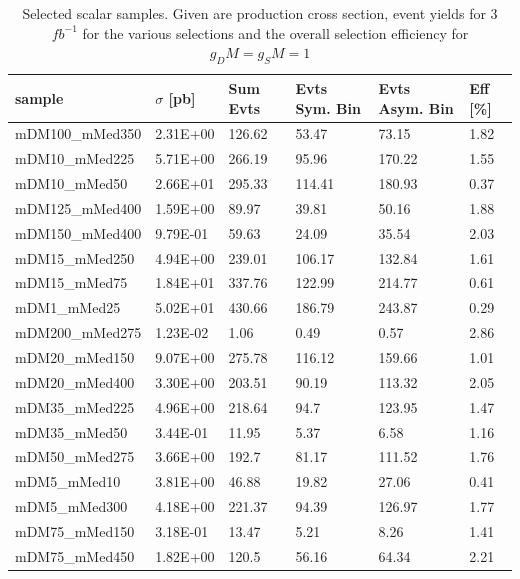 \begin{table}[h]
\centering
\begin{tabular}{llllll}
\hline
sample             & $\sigma$ [pb] & Sum Evts       & Evts Sym. Bin & Evts Asym. Bin & Eff  [\%]   \\\hline
mDM100\_mMed350 & 2.31E+00 & 126.62 & 53.47  & 73.15  & 1.82 \\
mDM10\_mMed225  & 5.71E+00 & 266.19 & 95.96  & 170.22 & 1.55 \\
mDM10\_mMed50   & 2.66E+01 & 295.33 & 114.41 & 180.93 & 0.37 \\
mDM125\_mMed400 & 1.59E+00 & 89.97  & 39.81  & 50.16  & 1.88 \\
mDM150\_mMed400 & 9.79E-01 & 59.63  & 24.09  & 35.54  & 2.03 \\
mDM15\_mMed250  & 4.94E+00 & 239.01 & 106.17 & 132.84 & 1.61 \\
mDM15\_mMed75   & 1.84E+01 & 337.76 & 122.99 & 214.77 & 0.61 \\
mDM1\_mMed25    & 5.02E+01 & 430.66 & 186.79 & 243.87 & 0.29 \\
mDM200\_mMed275 & 1.23E-02 & 1.06   & 0.49   & 0.57   & 2.86 \\
mDM20\_mMed150  & 9.07E+00 & 275.78 & 116.12 & 159.66 & 1.01 \\
mDM20\_mMed400  & 3.30E+00 & 203.51 & 90.19  & 113.32 & 2.05 \\
mDM35\_mMed225  & 4.96E+00 & 218.64 & 94.7   & 123.95 & 1.47 \\
mDM35\_mMed50   & 3.44E-01 & 11.95  & 5.37   & 6.58   & 1.16 \\
mDM50\_mMed275  & 3.66E+00 & 192.7  & 81.17  & 111.52 & 1.76 \\
mDM5\_mMed10    & 3.81E+00 & 46.88  & 19.82  & 27.06  & 0.41 \\
mDM5\_mMed300   & 4.18E+00 & 221.37 & 94.39  & 126.97 & 1.77 \\
mDM75\_mMed150  & 3.18E-01 & 13.47  & 5.21   & 8.26   & 1.41 \\
mDM75\_mMed450  & 1.82E+00 & 120.5  & 56.16  & 64.34  & 2.21\\
\hline
\end{tabular}
\caption{Selected scalar samples. Given are production cross section, event yields for 3 $fb^{-1 }$ for the various selections and the overall selection efficiency for $g_DM=g_SM=1$}
\label{tab:dm_S_g1_3fb}
\end{table}


